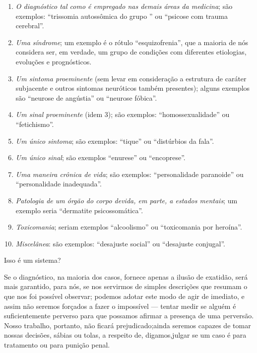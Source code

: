 \begin{enumerate}

\item \textit{O diagnóstico tal como é empregado nas demais áreas da
medicina}; são exemplos: ``trissomia autossômica do grupo '' ou ``psicose com trauma cerebral''.

\item \textit{Uma síndrome}; um exemplo é o rótulo ``esquizofrenia'',\idxesquiz{} que a maioria de nós considera ser, em verdade, um grupo de condições com diferentes
etiologias, evoluções e prognósticos.

\item \textit{Um sintoma proeminente} (sem levar em consideração a
estrutura de caráter subjacente e outros sintomas neuróticos também
presentes); alguns exemplos são ``neurose de angústia'' ou ``neurose
fóbica''.

\item \textit{Um sinal proeminente} (idem 3); são exemplos:
``homossexualidade'' ou ``fetichismo''.

\item \textit{Um único sintoma}; são exemplos:
``tique'' ou ``distúrbios da fala''.

\item \textit{Um único sinal}; são exemplos
``enurese'' ou ``encoprese''.

\item \textit{Uma maneira crônica de vida}; são exemplos:
``personalidade paranoide'' ou ``personalidade inadequada''.

\item \textit{Patologia de um órgão do corpo devida, em parte, a
estados mentais}; um exemplo seria ``dermatite psicossomática''.

\item \textit{Toxicomania}; seriam exemplos ``alcoolismo'' ou ``toxicomania
por heroína''.

\item \textit{Miscelânea}: são exemplos: ``desajuste
social'' ou ``desajuste conjugal''.

\end{enumerate}

Isso é um sistema?

Se o diagnóstico, na maioria dos casos, fornece apenas a ilusão de
exatidão, será mais garantido, para nós, se nos servirmos de simples
descrições que resumam o que nos foi possível observar; podemos adotar
este modo de agir de imediato, e assim não seremos forçados a fazer o
impossível --- tentar medir se alguém é suficientemente perverso para que
possamos afirmar a presença de uma perversão. Nosso trabalho, portanto,
não ficará prejudicado;\idxclass[|)] ainda seremos capazes de tomar nossas decisões,
sábias ou tolas, a respeito de, digamos,\idxdiag[|)] julgar se um caso é para
tratamento ou para punição penal.

